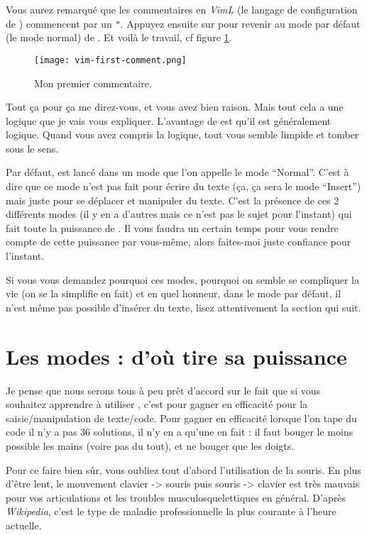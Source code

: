 Vous aurez remarqué que les commentaires en \emph{VimL} (le langage de configuration de \vim) commencent par un \Verb|"|. Appuyez ensuite sur \ttesc pour revenir au mode par défaut (le mode normal) de \vim. Et voilà le travail, cf figure \ref{fig:vim-first-comment}.

\begin{figure}%
  \texttt{[image: vim-first-comment.png]}
  \caption{Mon premier commentaire.}
  \label{fig:vim-first-comment}
\end{figure}

Tout ça pour ça me direz-vous, et vous avez bien raison. Mais tout cela a une logique que je vais vous expliquer. L'avantage de \vim est qu'il est généralement logique. Quand vous avez compris la logique, tout vous semble limpide et tomber sous le sens.

Par défaut, \vim est lancé dans un mode que l'on appelle le mode ``Normal''. C'est à dire que ce mode n'est pas fait pour écrire du texte (ça, ça sera le mode ``Insert'') mais juste pour se déplacer et manipuler du texte. C'est la présence de ces 2 différents modes (il y en a d'autres mais ce n'est pas le sujet pour l'instant) qui fait toute la puissance de \vim. Il vous faudra un certain temps pour vous rendre compte de cette puissance par vous-même, alors faites-moi juste confiance pour l'instant.

Si vous vous demandez pourquoi ces modes, pourquoi on semble se compliquer la vie (on se la simplifie en fait) et en quel honneur, dans le mode par défaut, il n'est même pas possible d'insérer du texte, lisez attentivement la section qui suit.

\section{Les modes : d'où \vim tire sa puissance}\label{sec:modes}

Je pense que nous serons tous à peu prêt d'accord sur le fait que si vous souhaitez apprendre à utiliser \vim, c'est pour gagner en efficacité pour la saisie/manipulation de texte/code. Pour gagner en efficacité lorsque l'on tape du code il n'y a pas 36 solutions, il n'y en a qu'une en fait : il faut bouger le moins possible les mains (voire pas du tout), et ne bouger que les doigts.

Pour ce faire bien sûr, vous oubliez tout d'abord l'utilisation de la souris. En plus d'être lent, le mouvement clavier -> souris puis souris -> clavier est très mauvais pour vos articulations et les troubles musculosquelettiques en général. D'après \emph{Wikipedia}, c'est le type de maladie professionnelle la plus courante à l'heure actuelle.

